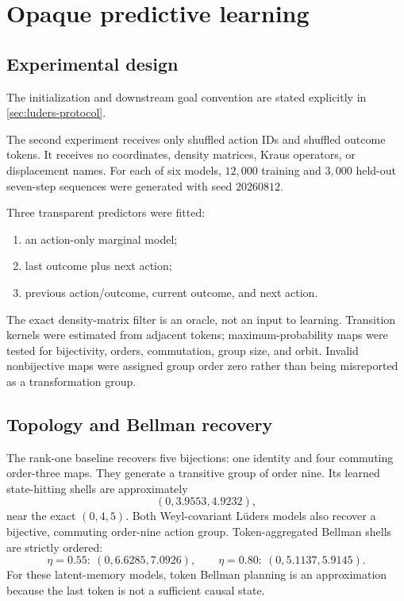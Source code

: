 \documentclass[11pt]{article}
\theoremstyle{definition}
\theoremstyle{remark}
\begin{document}
\section{Opaque predictive learning}

\subsection{Experimental design}

The initialization and downstream goal convention are stated explicitly in
\cref{sec:luders-protocol}.

The second experiment receives only shuffled action IDs and shuffled outcome
tokens. It receives no coordinates, density matrices, Kraus operators, or
displacement names. For each of six models, \(12{,}000\) training and
\(3{,}000\) held-out seven-step sequences were generated with seed
\(20260812\).

Three transparent predictors were fitted:
\begin{enumerate}
\item an action-only marginal model;
\item last outcome plus next action;
\item previous action/outcome, current outcome, and next action.
\end{enumerate}
The exact density-matrix filter is an oracle, not an input to learning.
Transition kernels were estimated from adjacent tokens; maximum-probability
maps were tested for bijectivity, orders, commutation, group size, and orbit.
Invalid nonbijective maps were assigned group order zero rather than being
misreported as a transformation group.

\subsection{Topology and Bellman recovery}

The rank-one baseline recovers five bijections: one identity and four
commuting order-three maps. They generate a transitive group of order nine.
Its learned state-hitting shells are approximately
\[
(0,3.9553,4.9232),
\]
near the exact \((0,4,5)\). Both Weyl-covariant Lüders models also recover a
bijective, commuting order-nine action group. Token-aggregated Bellman shells
are strictly ordered:
\[
\eta=0.55:\ (0,6.6285,7.0926),\qquad
\eta=0.80:\ (0,5.1137,5.9145).
\]
For these latent-memory models, token Bellman planning is an approximation
because the last token is not a sufficient causal state.
\end{document}
